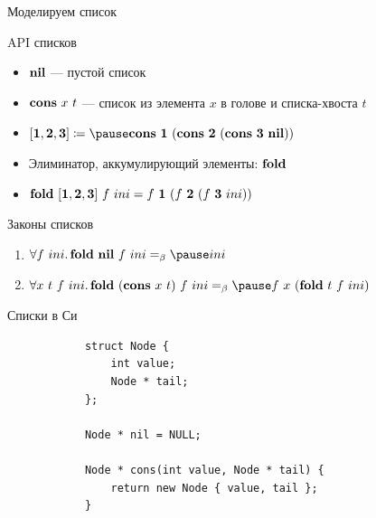     \begin{frame}[fragile]{Моделируем список}
        \pause
        \begin{block}{API списков}
            \begin{itemize}
                \item $\mathbf{nil}$ --- пустой список
                \item $\mathbf{cons} ~ x ~ t$ --- список из элемента $x$ в голове и списка-хвоста $t$
                \item[\eg] $\tlist{\term{1}, \term{2}, \term{3}} \termdef \pause \term{cons} \ap \term{1} \ap (\term{cons} \ap \term{2} \ap (\term{cons} \ap \term{3} \ap \term{nil}))$
                \item Элиминатор, аккумулирующий элементы: $\mathbf{fold}$
                \item[\eg] $\mathbf{fold} ~ \mathbf{[}\mathbf{1}, \mathbf{2}, \mathbf{3}\mathbf{]} ~ f ~ ini = f ~ \mathbf{1} ~ (f ~ \mathbf{2} ~ (f ~ \mathbf{3} ~ ini))$
            \end{itemize}
        \end{block}
        \pause
        \begin{block}{Законы списков}
            \begin{enumerate}
                \item \pause $\forall f~ini\ldotp \term{fold} \ap \term{nil} \ap f \ap ini \eqbeta \pause ini$
                \item \pause $\forall x~t~f~ini\ldotp \term{fold} \ap (\term{cons} \ap x \ap t) \ap f \ap ini \eqbeta \pause f \ap x \ap (\term{fold} \ap t \ap f \ap ini)$
            \end{enumerate}
        \end{block}
    \end{frame}

    \begin{frame}[fragile]{Списки в Си \popslide}
        \begin{verbatim}
            struct Node {
                int value;
                Node * tail;
            };

            Node * nil = NULL;

            Node * cons(int value, Node * tail) {
                return new Node { value, tail };
            }
        \end{verbatim}
    \end{frame}


